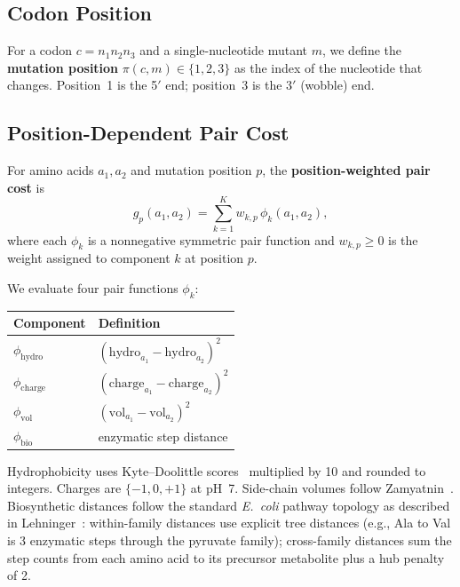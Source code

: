\documentclass[11pt,twocolumn]{article}
\begin{document}
\subsection{Codon Position}

For a codon $c = n_1 n_2 n_3$ and a single-nucleotide mutant $m$,
we define the \textbf{mutation position} $\pi(c,m) \in \{1,2,3\}$ as
the index of the nucleotide that changes. Position~1 is the 5$'$ end;
position~3 is the 3$'$ (wobble) end.

\subsection{Position-Dependent Pair Cost}

For amino acids $a_1, a_2$ and mutation position $p$, the
\textbf{position-weighted pair cost} is
\begin{equation}\label{eq:poscost}
  g_p(a_1, a_2) = \sum_{k=1}^{K} w_{k,p}\, \phi_k(a_1, a_2),
\end{equation}
where each $\phi_k$ is a nonnegative symmetric pair function and
$w_{k,p} \geq 0$ is the weight assigned to component $k$ at position $p$.

We evaluate four pair functions $\phi_k$:

\smallskip
\begin{center}
\small
\begin{tabular}{@{}ll@{}}
\toprule
Component & Definition \\
\midrule
$\phi_{\text{hydro}}$ & $(\text{hydro}_{a_1} - \text{hydro}_{a_2})^2$ \\
$\phi_{\text{charge}}$ & $(\text{charge}_{a_1} - \text{charge}_{a_2})^2$ \\
$\phi_{\text{vol}}$ & $(\text{vol}_{a_1} - \text{vol}_{a_2})^2$ \\
$\phi_{\text{bio}}$ & enzymatic step distance \\
\bottomrule
\end{tabular}
\end{center}
\smallskip

Hydrophobicity uses Kyte--Doolittle scores~\cite{KyteDoolittle1982}
multiplied by 10 and rounded to integers. Charges are $\{-1, 0, +1\}$ at
pH~7. Side-chain volumes follow Zamyatnin~\cite{Zamyatnin1972}.
Biosynthetic distances follow the standard \emph{E.~coli} pathway
topology as described in Lehninger~\cite{Lehninger}: within-family
distances use explicit tree distances (e.g., Ala to Val is 3 enzymatic
steps through the pyruvate family); cross-family distances sum the step
counts from each amino acid to its precursor metabolite plus a hub penalty
of 2.
\end{document}
